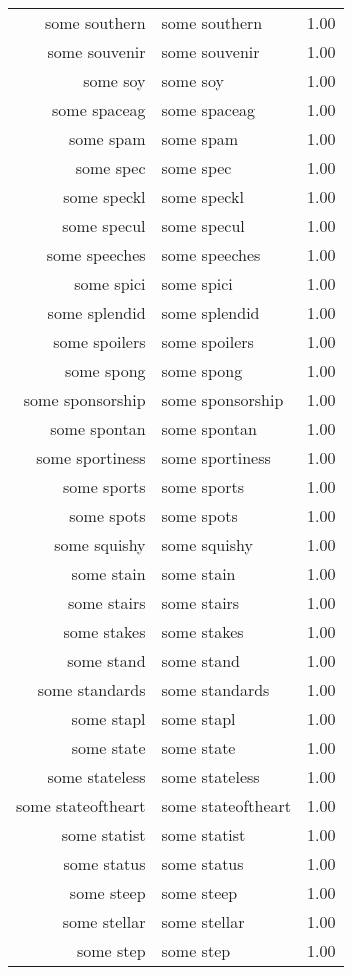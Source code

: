 \begin{table}[ht]
\begin{tabular}{rlr}
  some southern & some southern & 1.00 \\ 
  some souvenir & some souvenir & 1.00 \\ 
  some soy & some soy & 1.00 \\ 
  some spaceag & some spaceag & 1.00 \\ 
  some spam & some spam & 1.00 \\ 
  some spec & some spec & 1.00 \\ 
  some speckl & some speckl & 1.00 \\ 
  some specul & some specul & 1.00 \\ 
  some speeches & some speeches & 1.00 \\ 
  some spici & some spici & 1.00 \\ 
  some splendid & some splendid & 1.00 \\ 
  some spoilers & some spoilers & 1.00 \\ 
  some spong & some spong & 1.00 \\ 
  some sponsorship & some sponsorship & 1.00 \\ 
  some spontan & some spontan & 1.00 \\ 
  some sportiness & some sportiness & 1.00 \\ 
  some sports & some sports & 1.00 \\ 
  some spots & some spots & 1.00 \\ 
  some squishy & some squishy & 1.00 \\ 
  some stain & some stain & 1.00 \\ 
  some stairs & some stairs & 1.00 \\ 
  some stakes & some stakes & 1.00 \\ 
  some stand & some stand & 1.00 \\ 
  some standards & some standards & 1.00 \\ 
  some stapl & some stapl & 1.00 \\ 
  some state & some state & 1.00 \\ 
  some stateless & some stateless & 1.00 \\ 
  some stateoftheart & some stateoftheart & 1.00 \\ 
  some statist & some statist & 1.00 \\ 
  some status & some status & 1.00 \\ 
  some steep & some steep & 1.00 \\ 
  some stellar & some stellar & 1.00 \\ 
  some step & some step & 1.00 \\ 

\end{tabular}
\end{table}
